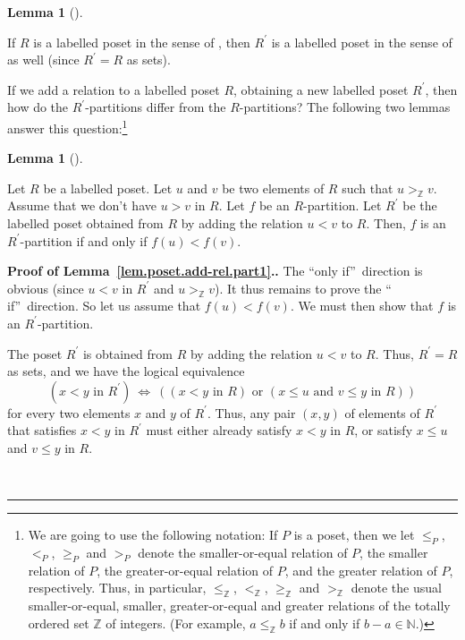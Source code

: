\documentclass[numbers=enddot,12pt,final,onecolumn,notitlepage]{scrartcl}%
\theoremstyle{definition}
\newtheorem{lem}[theo]{Lemma}
\newenvironment{lemma}[1][]
{\begin{lem}[#1]\begin{leftbar}}
{\end{leftbar}\end{lem}}
\newenvironment{proof}[1][Proof]{\noindent\textbf{#1.} }{\ \rule{0.5em}{0.5em}}
\newenvironment{verlong}{}{}
\newcommand{\NN}{\mathbb{N}}
\newcommand{\ZZ}{\mathbb{Z}}
\begin{document}
\begin{verlong}
\begin{lemma}
If $R$ is a labelled poset in the sense of \cite[Section
5.2]{HopfComb}, then $R^{\prime}$ is a labelled poset in the
sense of \cite[Section 5.2]{HopfComb} as well (since $R^{\prime} = R$
as sets).
\end{lemma}

If we add a relation to a labelled poset $R$, obtaining a new labelled
poset $R^{\prime}$, then how do the $R^{\prime}$-partitions differ from
the $R$-partitions?
The following two lemmas answer this question:\footnote{We are
going to use the following notation:
If $P$ is a poset, then we let $\leq_P$, $<_P$, $\geq_P$
and $>_P$ denote the smaller-or-equal relation of $P$, the
smaller relation of $P$, the greater-or-equal relation
of $P$, and the greater relation of $P$, respectively.
Thus, in particular, $\leq_{\ZZ}$, $<_{\ZZ}$, $\geq_{\ZZ}$
and $>_{\ZZ}$ denote the usual smaller-or-equal, smaller,
greater-or-equal and greater relations of the totally
ordered set $\ZZ$ of integers.
(For example, $a \leq_{\ZZ} b$ if and only if $b - a \in \NN$.)}

\begin{lemma}
\label{lem.poset.add-rel.part1}
Let $R$ be a labelled poset. Let $u$ and $v$ be
two elements of $R$ such that $u >_{\ZZ} v$.
Assume that we don't have $u > v$ in $R$.
Let $f$ be an $R$-partition.
Let $R^{\prime}$ be the labelled poset obtained from $R$ by adding the
relation $u < v$ to $R$.
Then, $f$ is an $R^{\prime}$-partition if and only if
$f \left(u\right) < f\left(v\right)$.
\end{lemma}

\begin{proof}[Proof of Lemma~\ref{lem.poset.add-rel.part1}.]
The \textquotedblleft only
if\textquotedblright\ direction is obvious (since $u<v$ in $R^{\prime}$ and
$u>_{\ZZ}v$). It thus remains to prove the \textquotedblleft
if\textquotedblright\ direction. So let us assume that $f\left(  u\right)
<f\left(  v\right)  $. We must then show that $f$ is an $R^{\prime}$-partition.

The poset $R^{\prime}$ is obtained from $R$ by adding the relation $u<v$ to
$R$. Thus, $R^{\prime}=R$ as sets, and we have the logical equivalence%
\[
\left(  x<y\text{ in }R^{\prime}\right)  \ \Longleftrightarrow\ \left(
\left(  x<y\text{ in }R\right)  \text{ or }\left(  x\leq u\text{ and }v\leq
y\text{ in }R\right)  \right)
\]
for every two elements $x$ and $y$ of $R^{\prime}$. Thus, any pair $\left(
x,y\right)  $ of elements of $R^{\prime}$ that satisfies $x<y$ in $R^{\prime}$
must either already satisfy $x<y$ in $R$, or satisfy $x\leq u$ and $v\leq y$
in $R$.


\end{proof}
\end{verlong}
\end{document}
